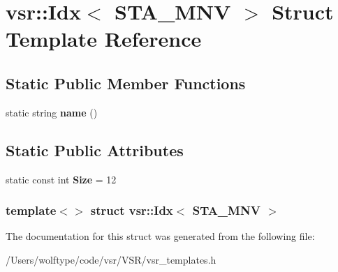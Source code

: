 \hypertarget{structvsr_1_1_idx_3_01_s_t_a___m_n_v_01_4}{\section{vsr\-:\-:Idx$<$ S\-T\-A\-\_\-\-M\-N\-V $>$ Struct Template Reference}
\label{structvsr_1_1_idx_3_01_s_t_a___m_n_v_01_4}
}
\subsection*{Static Public Member Functions}
\begin{DoxyCompactItemize}
\item 
\hypertarget{structvsr_1_1_idx_3_01_s_t_a___m_n_v_01_4_ac39168d71b9057abe66f14081762bb4c}{static string {\bfseries name} ()}\label{structvsr_1_1_idx_3_01_s_t_a___m_n_v_01_4_ac39168d71b9057abe66f14081762bb4c}

\end{DoxyCompactItemize}
\subsection*{Static Public Attributes}
\begin{DoxyCompactItemize}
\item 
\hypertarget{structvsr_1_1_idx_3_01_s_t_a___m_n_v_01_4_a66fbd76053f81f9f4c44f0418c9f825c}{static const int {\bfseries Size} = 12}\label{structvsr_1_1_idx_3_01_s_t_a___m_n_v_01_4_a66fbd76053f81f9f4c44f0418c9f825c}

\end{DoxyCompactItemize}
\subsubsection*{template$<$$>$ struct vsr\-::\-Idx$<$ S\-T\-A\-\_\-\-M\-N\-V $>$}



The documentation for this struct was generated from the following file\-:\begin{DoxyCompactItemize}
\item 
/\-Users/wolftype/code/vsr/\-V\-S\-R/vsr\-\_\-templates.\-h\end{DoxyCompactItemize}
